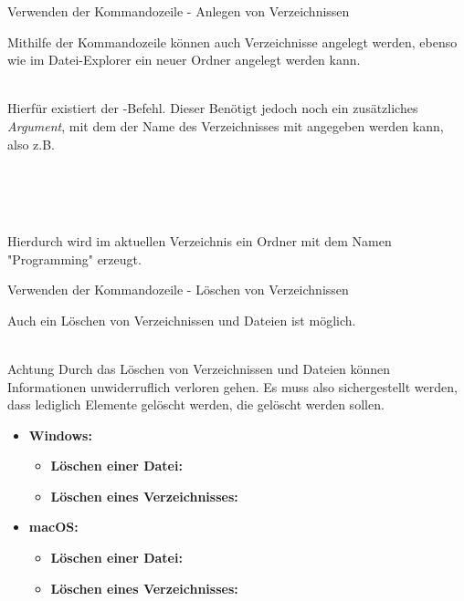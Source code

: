     
     \begin{frame}{Verwenden der Kommandozeile - Anlegen von Verzeichnissen}
        
        Mithilfe der Kommandozeile können auch Verzeichnisse angelegt werden, ebenso wie im Datei-Explorer ein neuer Ordner angelegt werden kann.\\~\
        
        Hierfür existiert der -Befehl. Dieser Benötigt jedoch noch ein zusätzliches \textit{Argument}, mit dem der Name des Verzeichnisses mit angegeben werden kann, also z.B. \\~\
        
         \\~\
        
        Hierdurch wird im aktuellen Verzeichnis ein Ordner mit dem Namen "Programming" erzeugt.
    \end{frame}
    
    \begin{frame}{Verwenden der Kommandozeile - Löschen von Verzeichnissen}
        
        Auch ein Löschen von Verzeichnissen und Dateien ist möglich.\\~\
        
        \begin{alertblock}{Achtung}
            Durch das Löschen von Verzeichnissen und Dateien können Informationen unwiderruflich verloren gehen. Es muss also sichergestellt werden, dass lediglich Elemente gelöscht werden, die gelöscht werden sollen.
        \end{alertblock}
        
        \begin{itemize}
            \item \textbf{Windows:} 
                \begin{itemize}
                    \item \textbf{Löschen einer Datei:} 
                    \item \textbf{Löschen eines Verzeichnisses:} 
                \end{itemize}
            \item \textbf{macOS:}
                \begin{itemize}
                    \item \textbf{Löschen einer Datei:} 
                    \item \textbf{Löschen eines Verzeichnisses:} 
                \end{itemize}
        \end{itemize}
        
    \end{frame}
    
